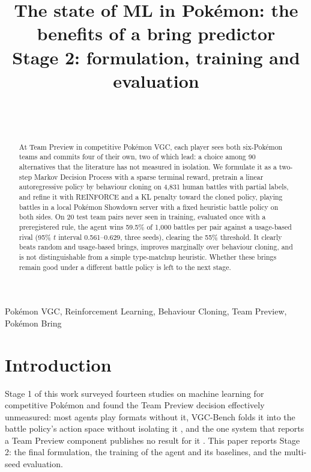 \documentclass[conference]{IEEEtran}
\begin{document}
\title{The state of ML in Pokémon: the benefits of a bring predictor\\
\large Stage 2: formulation, training and evaluation}

\author{
\\
\\
}

\maketitle

\begin{abstract}
At Team Preview in competitive Pok\'emon VGC, each player sees both six-Pok\'emon teams and commits four of
their own, two of which lead: a choice among 90 alternatives that the literature has not measured in
isolation. We formulate it as a two-step Markov Decision Process with a sparse terminal reward, pretrain a
linear autoregressive policy by behaviour cloning on 4{,}831 human battles with partial labels, and refine it
with REINFORCE and a KL penalty toward the cloned policy, playing battles in a local Pok\'emon Showdown server
with a fixed heuristic battle policy on both sides. On 20 test team pairs never seen in training, evaluated
once with a preregistered rule, the agent wins 59.5\% of 1{,}000 battles per pair against a usage-based
rival (95\% $t$ interval 0.561--0.629, three seeds), clearing the 55\% threshold. It clearly beats random and
usage-based brings, improves marginally over behaviour cloning, and is not distinguishable from a simple
type-matchup heuristic. Whether these brings remain good under a different battle policy is left to the
next stage.
\end{abstract}

\begin{IEEEkeywords}
Pokémon VGC, Reinforcement Learning, Behaviour Cloning, Team Preview, Pokémon Bring
\end{IEEEkeywords}

\section{Introduction}
Stage 1 of this work surveyed fourteen studies on machine learning for competitive Pok\'emon and found the
Team Preview decision effectively unmeasured: most agents play formats without it, VGC-Bench folds it into the
battle policy's action space without isolating it \cite{angliss2026}, and the one system that reports a Team
Preview component publishes no result for it \cite{rodriguez2024}. This paper reports Stage 2: the final
formulation, the training of the agent and its baselines, and the multi-seed evaluation.
\end{document}
